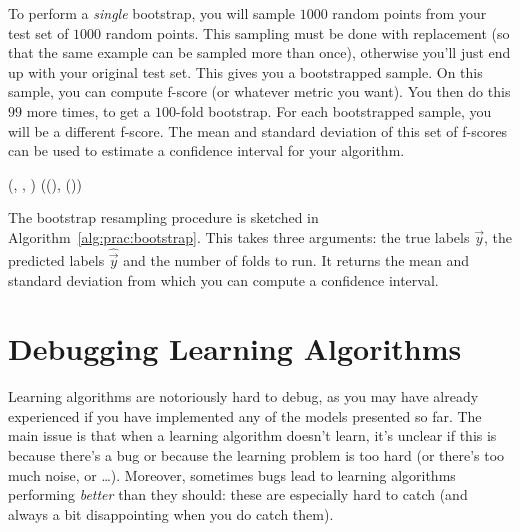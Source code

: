 To perform a \emph{single} bootstrap, you will sample $1000$ random
points from your test set of $1000$ random points.  This sampling must
be done with replacement (so that the same example can be sampled more
than once), otherwise you'll just end up with your original test set.
This gives you a bootstrapped sample.  On this sample, you can compute
f-score (or whatever metric you want).  You then do this $99$ more
times, to get a $100$-fold bootstrap.  For each bootstrapped sample,
you will be a different f-score.  The mean and standard deviation of
this set of f-scores can be used to estimate a confidence interval for
your algorithm.

%
  {(, , )}
  {
\ENDFOR
{}
\ENDFOR
\RETURN ((), ())
}

The bootstrap resampling procedure is sketched in
Algorithm~\ref{alg:prac:bootstrap}.  This takes three arguments: the
true labels $\vec y$, the predicted labels $\hat{\vec y}$ and the
number of folds to run.  It returns the mean and standard deviation
from which you can compute a confidence interval.

\section{Debugging Learning Algorithms}

Learning algorithms are notoriously hard to debug, as you may have
already experienced if you have implemented any of the models
presented so far.  The main issue is that when a learning algorithm
doesn't learn, it's unclear if this is because there's a bug or
because the learning problem is too hard (or there's too much noise,
or \dots).  Moreover, sometimes bugs lead to learning algorithms
performing \emph{better} than they should: these are especially hard
to catch (and always a bit disappointing when you do catch them).

